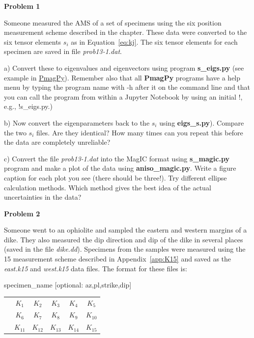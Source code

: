 {\parindent 0pt  \parskip 12pt

{\bf Problem 1}

Someone measured the AMS of a set of specimens using the six position measurement scheme described in the chapter.  These data were converted to the six tensor elements $s_i$ as in Equation~\ref{eq:kj}.  The six tensor elements for each specimen are saved in file {\it prob13-1.dat}.   

a) Convert these to eigenvalues and eigenvectors using program {\bf s\_eigs.py} (see example in \href{http://earthref.org/PmagPy#s_eigs.py}{PmagPy}). Remember also that all {\bf PmagPy} programs have a help menu by typing the program name with -h after it on the command line and that you can call the program from within a Jupyter Notebook by using an initial !, e.g., !s\_eigs.py.)   

b) Now convert the eigenparameters back to the $s_i$ using {\bf eigs\_s.py}).  Compare the two $s_i$ files.  Are they identical?  How many times can you repeat this before the data are completely unreliable?  

c) Convert the file {\it prob13-1.dat} into the MagIC format using {\bf s\_magic.py} program and make a plot of the data using {\bf aniso\_magic.py}.    Write a figure caption for each plot you see (there should be three!).  Try different ellipse calculation methods.  Which method gives the best idea of the actual uncertainties in the data?  



{\bf Problem 2}


Someone went to an  ophiolite and sampled the eastern and western margins of a dike.  They also measured the dip direction and dip of the dike in several places (saved in the file {\it dike.dd}).    Specimens from the samples were measured using the 15 measurement scheme described in Appendix~\ref{app:K15} and saved as  the {\it east.k15} and {\it west.k15} data files.  The format for these files is:  
\vskip 6pt
{\parskip 0pt
specimen\_name [optional: az,pl,strike,dip]

\begin{tabular}{cccccc}
 & $K_1$&$K_2$&$K_3$&$K_4$&$K_5$\\
  & $K_6$&$K_7$&$K_8$&$K_9$&$K_{10}$\\
   & $K_{11}$&$K_{12}$&$K_{13}$&$K_{14}$&$K_{15}$\\
\end{tabular}}

}
